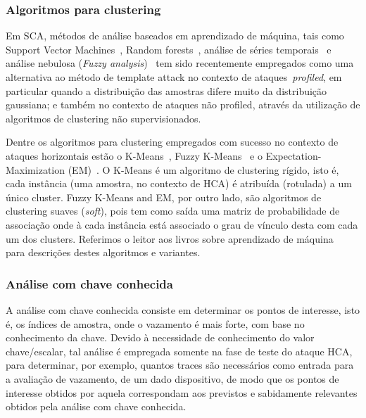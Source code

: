 \subsubsection{Algoritmos para clustering}

Em SCA, métodos de análise baseados em aprendizado de máquina, tais como Support Vector Machines~\cite{Bartkewitz2013}, Random forests~\cite{Lerman2014RFandSOM}, análise de séries temporais~\cite{Lerman2013} e análise nebulosa (\textit{Fuzzy analysis})~\cite{SaeediKong2014}  tem sido recentemente empregados como uma alternativa ao método de template attack no contexto de ataques~\textit{profiled}, em particular quando a distribuição das amostras difere muito da distribuição gaussiana; e também no contexto de ataques não profiled, através da utilização de algoritmos de clustering não supervisionados.


Dentre os algoritmos para clustering empregados com sucesso no contexto de ataques horizontais estão o K-Means~\cite{Forgy1965KMeans, Lloyd1982KMeans}, Fuzzy K-Means~\cite{Dunn1973FuzzyKMeans} e o Expectation-Maximization (EM)~\cite{DempsterLairdRubin1977EMAlg}. O K-Means é um algoritmo de clustering rígido, isto é, cada instância (uma amostra, no contexto de HCA) é atribuída (rotulada) a um único cluster. Fuzzy K-Means and EM, por outro lado, são algoritmos de clustering suaves (\textit{soft}), pois tem como saída uma matriz de probabilidade de associação onde à cada instância está associado o grau de vínculo desta com cada um dos clusters. Referimos o leitor aos livros sobre aprendizado de máquina~\cite{Alpaydin2014, WittenFrank2011, Han2011, Bishop2007, DudaHartStork2001} para descrições destes algoritmos e variantes.


\subsubsection{Análise com chave conhecida}

A análise com chave conhecida consiste em determinar os pontos de interesse, isto é, os índices de amostra, onde o vazamento é mais forte, com base no conhecimento da chave. Devido à necessidade de conhecimento do valor chave/escalar, tal análise é empregada somente na fase de teste do ataque HCA, para determinar, por exemplo, quantos traces são necessários como entrada para a avaliação de vazamento, de um dado dispositivo, de modo que os pontos de interesse obtidos por aquela correspondam aos previstos e sabidamente relevantes obtidos pela análise com chave conhecida.

